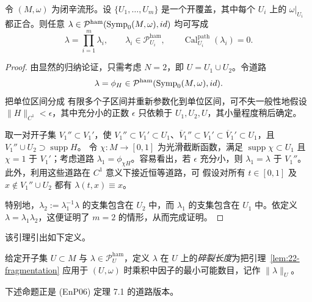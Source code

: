 \begin{lemma}[碎裂引理 (Ba78)]
\label{lem:22-fragmentation}
令 $(M,\omega)$ 为闭辛流形。设 $\{U_1,\ldots,U_m\}$ 是一个开覆盖，其中每个
$U_i$ 上的 $\omega|_{U_i}$ 都正合。则任意
$\lambda\in\mathcal P^{\mathrm{ham}}(\operatorname{Symp}_0(M,\omega),id)$ 均可写成
\[
 \lambda=\prod_{i=1}^m\lambda_i,
 \qquad \lambda_i\in\mathcal P_{U_i}^{\mathrm{ham}},
 \qquad \operatorname{Cal}_{U_i}^{\mathrm{path}}(\lambda_i)=0.
\]
\end{lemma}

\begin{proof}
由显然的归纳论证，只需考虑 $N=2$，即 $U=U_1\cup U_2$。令道路
\[
 \lambda=\phi_H\in\mathcal P^{\mathrm{ham}}(\operatorname{Symp}_0(M,\omega),id).
\]
把单位区间分成
有限多个子区间并重新参数化到单位区间，可不失一般性地假设
$\lVert H\rVert_{C^1}<\epsilon$，其中充分小的正数 $\epsilon$ 只依赖于
$U_1,U_2,U$，其小量程度稍后确定。

取一对开子集 $V_1''\subset V_1'$，使
$V_1''\subset V_1'\subset U_1$、$\overline V_1''\subset V_1'\subset
\overline V_1'\subset U_1$，且 $V_1''\cup U_2\supset\operatorname{supp}H$。
令 $\chi:M\to[0,1]$ 为光滑截断函数，满足
$\operatorname{supp}\chi\subset U_1$ 且 $\chi=1$ 于 $V_1'$；考虑道路
$\lambda_1=\phi_{\chi H}$。容易看出，若 $\epsilon$ 充分小，则
$\lambda_1=\lambda$ 于 $V_1''$。此外，利用这些道路在 $C^1$ 意义下接近恒等道路，可
假设对所有 $t\in[0,1]$ 及 $x\notin V_1''\cup U_2$ 都有 $\lambda(t,x)\equiv x$。

特别地，$\lambda_2:=\lambda_1^{-1}\lambda$ 的支集包含在 $U_2$ 中，而
$\lambda_1$ 的支集包含在 $U_1$ 中。依定义 $\lambda=\lambda_1\lambda_2$，这便证明了
$m=2$ 的情形，从而完成证明。
\end{proof}

该引理引出如下定义。

\begin{definition}
\label{def:22-fragmentation-length}
给定开子集 $U\subset M$ 与 $\lambda\in\mathcal P_U^{\mathrm{ham}}$，定义
$\lambda$ 在 $U$ 上的\emph{碎裂长度}为把引理~\ref{lem:22-fragmentation} 应用于
$(U,\omega)$ 时乘积中因子的最小可能数目，记作 $\lVert\lambda\rVert_U$。
\end{definition}

下述命题正是 (EnP06) 定理 7.1 的道路版本。

